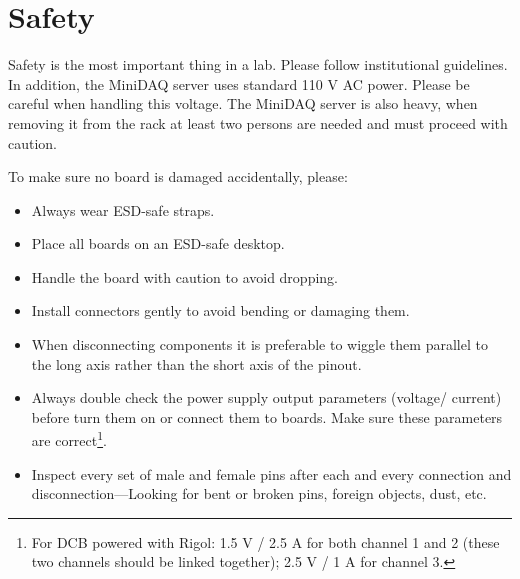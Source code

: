 \section{Safety}
Safety is the most important thing in a lab. Please follow institutional guidelines.
In addition, the MiniDAQ server uses standard 110 V AC power. Please be careful
when handling this voltage.
The MiniDAQ server is also heavy, when removing it from the rack at least two
persons are needed and must proceed with caution.

To make sure no board is damaged accidentally, please:
\begin{itemize}
    \item Always wear ESD-safe straps.
    \item Place all boards on an ESD-safe desktop.
    \item Handle the board with caution to avoid dropping.
    \item Install connectors gently to avoid bending or damaging them.
    \item When disconnecting components it is preferable to wiggle them parallel
        to the long axis rather than the short axis of the pinout.
    \item Always double check the power supply output parameters (voltage/
        current) before turn them on or connect them to boards.
        Make sure these parameters are correct\footnote{
            For DCB powered with Rigol: 1.5 V / 2.5 A for both channel 1 and 2
            (these two channels should be linked together); 2.5 V / 1 A for
            channel 3.
        }.
    \item Inspect every set of male and female pins after each and every
        connection and disconnection---Looking for bent or broken pins, foreign
        objects, dust, etc.
\end{itemize}
